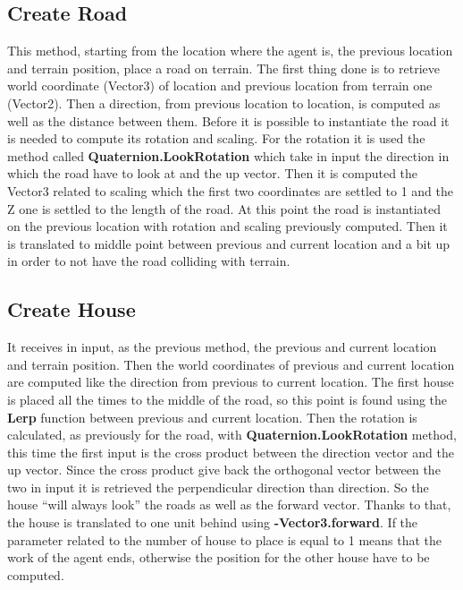 \documentclass[12pt]{article}
\begin{document}
    \subsection{Create Road} \label{section:CreateRoad}
    This method, starting from the location where the agent is, the previous location and terrain position, place a road on terrain. The first thing done is to retrieve 
    world coordinate (Vector3) of location and previous location from terrain one (Vector2). Then a direction, from previous location to location, is computed as well as the distance
    between them. Before it is possible to instantiate the road it is needed to compute its rotation and scaling. For the rotation it is used the 
    method called \textbf{Quaternion.LookRotation} which take in input the direction in which the road have to look at and the up vector. Then it is computed the Vector3
    related to scaling which the first two coordinates are settled to 1 and the Z one is settled to the length of the road. At this point the road is instantiated on the previous
    location with rotation and scaling previously computed. Then it is translated to middle point between previous and current location and a bit up in order to not have the 
    road colliding with terrain.

    \subsection{Create House} \label{section:CreateHouse}
    It receives in input, as the previous method, the previous and current location and terrain position. Then the world coordinates of previous and current location are 
    computed like the direction from previous to current location. The first house is placed all the times to the middle of the road, so this point is found using the \textbf{Lerp}
    function between previous and current location. Then the rotation is calculated, as previously for the road, with \textbf{Quaternion.LookRotation} method, this time the
    first input is the cross product between the direction vector and the up vector. Since the cross product give back the orthogonal vector between the two in input
    it is retrieved the perpendicular direction than direction. So the house ``will always look'' the roads as well as the forward vector. Thanks to that, the house is
    translated to one unit behind using \textbf{-Vector3.forward}. If the parameter related to the number of house to place is equal to 1 means that the work of the agent ends, 
    otherwise the position for the other house have to be computed. 
    
\end{document}
